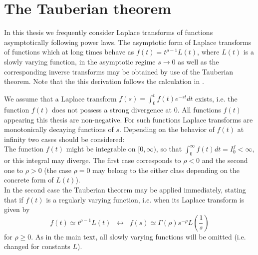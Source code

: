 \chapter{The Tauberian theorem} \label{sec:tauberian}

In this thesis we frequently consider Laplace transforms of functions asymptotically following power laws. The asymptotic form of Laplace transforms of functions which at long times behave as $f(t) = t^{\rho-1} L(t)$, where $L(t)$ is a slowly varying function, in the asymptotic regime $s \to 0$ as well as the corresponding inverse transforms may be obtained by use of the Tauberian theorem. Note that the this derivation follows the calculation in \cite{bothe}.

We assume that a Laplace transform $f(s) = \int_0^t f(t) e^{-st} dt$ exists, i.e. the function $f(t)$ does not possess a strong divergence at 0. All functions $f(t)$ appearing this thesis are non-negative. For such functions Laplace transforms are monotonically decaying functions of $s$. Depending on the behavior of $f(t)$ at infinity two cases should be considered: \\
The function $f(t)$ might be integrable on $[0, \infty)$, so that 
$\int_0^\infty f(t) dt = I_0^{f} < \infty$, or this integral may diverge. The first case corresponds to $\rho < 0$ and 
the second one to $\rho > 0$ (the case $\rho = 0$ may belong to the either class depending on the concrete form of $L(t)$). \\
In the second case the Tauberian theorem may be applied immediately, stating that if $f(t)$ is a regularly varying function, i.e. when  its Laplace transform is given by 
\begin{equation}
 f(t) \simeq t^{\rho-1} L(t) \;\; \leftrightarrow \;\; f(s) \simeq \Gamma(\rho) s^{-\rho} L\left(\frac{1}{s}\right)
 \label{eq:Tauberian}
\end{equation}
for $\rho \geq 0$. As in the main text, all slowly varying functions will be omitted (i.e. changed for constants $L$). 

